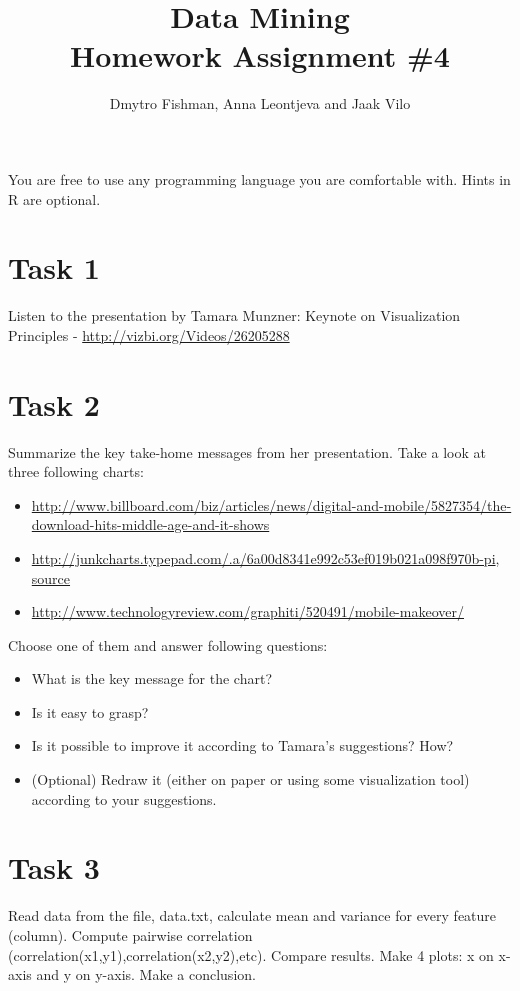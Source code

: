 \documentclass{article}
\title{Data Mining\\Homework Assignment \#4} %
\author{Dmytro Fishman, Anna Leontjeva and Jaak Vilo} %
\begin{document}
\maketitle %

You are free to use any programming language you are comfortable with. Hints in R are optional. 

\section*{Task 1}
Listen to the presentation by Tamara Munzner: Keynote on Visualization Principles - \url{http://vizbi.org/Videos/26205288}

\section*{Task 2}
Summarize the key take-home messages from her presentation. Take a look at three following charts:
\begin{itemize}
\item \url{http://www.billboard.com/biz/articles/news/digital-and-mobile/5827354/the-download-hits-middle-age-and-it-shows}
\item \url{http://junkcharts.typepad.com/.a/6a00d8341e992c53ef019b021a098f970b-pi}, \href{http://www.scientificamerican.com/article/the-truth-about-chinas-patent-boom/}{source}
\item \url{http://www.technologyreview.com/graphiti/520491/mobile-makeover/}
\end{itemize}

Choose one of them and answer following questions:
\begin{itemize}
\item What is the key message for the chart?
\item Is it easy to grasp?
\item Is it possible to improve it according to Tamara's suggestions? How?
\item (Optional) Redraw it (either on paper or using some visualization tool) according to your suggestions.
\end{itemize} 

\section*{Task 3}
Read data from the file, data.txt, calculate mean and variance for every feature (column). Compute pairwise correlation (correlation(x1,y1),correlation(x2,y2),etc). Compare results. Make 4 plots: x on x-axis and y on y-axis. Make a conclusion. 
\end{document}
